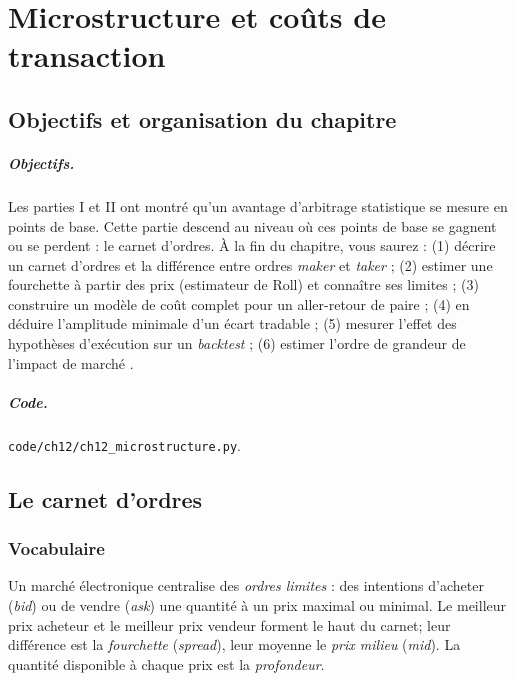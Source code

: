\chapter{Microstructure et coûts de transaction}
\label{ch:12}

\section{Objectifs et organisation du chapitre}

\paragraph{Objectifs.} Les parties I et II ont montré qu'un avantage d'arbitrage statistique se mesure en points de base. Cette partie descend au niveau où ces points de base se gagnent ou se perdent : le carnet d'ordres. À la fin du chapitre, vous saurez : (1) décrire un carnet d'ordres et la différence entre ordres \emph{maker} et \emph{taker} ; (2) estimer une fourchette à partir des prix (estimateur de Roll) et connaître ses limites ; (3) construire un modèle de coût complet pour un aller-retour de paire ; (4) en déduire l'amplitude minimale d'un écart tradable ; (5) mesurer l'effet des hypothèses d'exécution sur un \emph{backtest} ; (6) estimer l'ordre de grandeur de l'impact de marché \citep{harris2003}.

\paragraph{Code.} \texttt{code/ch12/ch12\_microstructure.py}.

\section{Le carnet d'ordres}

\subsection{Vocabulaire}

Un marché électronique centralise des \emph{ordres limites} : des intentions d'acheter (\emph{bid}) ou de vendre (\emph{ask}) une quantité à un prix maximal ou minimal. Le meilleur prix acheteur et le meilleur prix vendeur forment le \og haut du carnet\fg ; leur différence est la \emph{fourchette} (\emph{spread}), leur moyenne le \emph{prix milieu} (\emph{mid}). La quantité disponible à chaque prix est la \emph{profondeur}.

